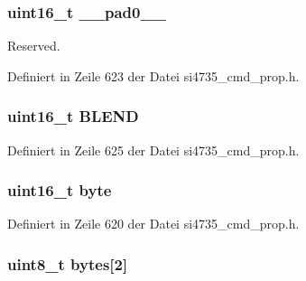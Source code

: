 \subsubsection[{\+\_\+\+\_\+pad0\+\_\+\+\_\+}]{\setlength{\rightskip}{0pt plus 5cm}uint16\+\_\+t \+\_\+\+\_\+pad0\+\_\+\+\_\+}\label{unionfm__rsq__blend__thres_a77132c2c26a75f5b8751b235cda23828}


Reserved. 



Definiert in Zeile 623 der Datei si4735\+\_\+cmd\+\_\+prop.\+h.

\hypertarget{unionfm__rsq__blend__thres_a7fff6ea820b5ed6b06e0df95ef82f3d8}{}
\subsubsection[{B\+L\+E\+N\+D}]{\setlength{\rightskip}{0pt plus 5cm}uint16\+\_\+t B\+L\+E\+N\+D}\label{unionfm__rsq__blend__thres_a7fff6ea820b5ed6b06e0df95ef82f3d8}


Definiert in Zeile 625 der Datei si4735\+\_\+cmd\+\_\+prop.\+h.

\hypertarget{unionfm__rsq__blend__thres_ab0549c1b5ea980a02e7eab77e21fea49}{}
\subsubsection[{byte}]{\setlength{\rightskip}{0pt plus 5cm}uint16\+\_\+t byte}\label{unionfm__rsq__blend__thres_ab0549c1b5ea980a02e7eab77e21fea49}


Definiert in Zeile 620 der Datei si4735\+\_\+cmd\+\_\+prop.\+h.

\hypertarget{unionfm__rsq__blend__thres_a46e4c05d20a047ec169f60d3167e912e}{}
\subsubsection[{bytes}]{\setlength{\rightskip}{0pt plus 5cm}uint8\+\_\+t bytes\mbox{[}2\mbox{]}}\label{unionfm__rsq__blend__thres_a46e4c05d20a047ec169f60d3167e912e}


